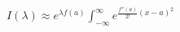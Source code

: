 \documentclass[preview]{standalone}
\begin{document}
\begin{align*}
I(\lambda) \approx \displaystyle e^{\lambda f(a)} \int_{-\infty}^{\infty} e^{\frac{f''(a)}{2!}(x - a)^2}
\end{align*}
\end{document}
